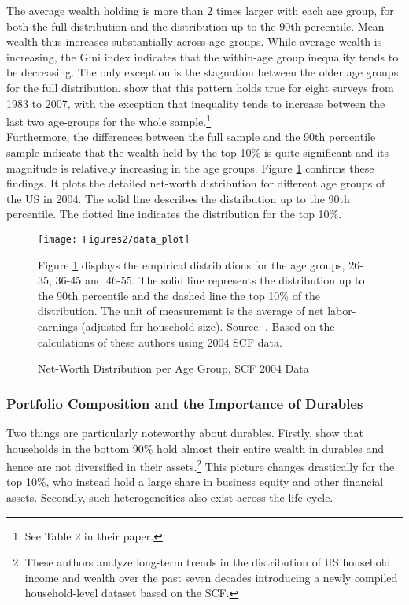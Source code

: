 \documentclass[a4paper,12pt,legno]{article}
\begin{document}
The average wealth holding is more than $2$ times larger with each age group, for both the full distribution and the distribution up to the 90th percentile. Mean wealth thus increases substantially across age groups. While average wealth is increasing, the Gini index indicates that the within-age group inequality tends to be decreasing. The only exception is the stagnation between the older age groups for the full distribution. \cite{hintermaier2011} show that this pattern holds true for eight surveys from 1983 to 2007, with the exception that inequality tends to  increase between the last two age-groups for the whole sample.\footnote{See Table 2 in their paper.} \\
Furthermore, the differences between the full sample and the 90th percentile sample indicate that the wealth held by the top 10\% is quite significant and its magnitude is relatively increasing in the age groups. Figure \ref{scf_data} confirms these findings. It plots the detailed net-worth distribution for different age groups of the US in 2004. The solid line describes the distribution up to the 90th percentile. The dotted line indicates the distribution for the top 10\%. 
\begin{figure}[!htbp]
\caption{Net-Worth Distribution per Age Group, SCF 2004 Data} 
\label{scf_data}	%
\centering
\texttt{[image: Figures2/data\_plot]}  %

\begin{minipage}{0.8\linewidth}
\footnotesize{Figure \ref{scf_data} displays the empirical distributions for the age groups, 26-35, 36-45 and 46-55. The solid line represents the distribution up to the 90th percentile and the dashed line the top 10\% of the distribution. The unit of measurement is the average of net labor-earnings (adjusted for household size). Source: \cite{hintermaier2011}. Based on the calculations of these authors using 2004 SCF data. }
\end{minipage}

\end{figure}

\subsubsection{Portfolio Composition and the Importance of Durables}
Two things are particularly noteworthy about durables. Firstly, \cite{kuhn2017income} show that households in the bottom 90\% hold almost their entire wealth in durables and hence are not diversified in their assets.\footnote{These authors analyze long-term trends in the distribution of US household income and wealth over the past seven decades introducing a newly compiled household-level dataset based on the SCF.} This picture changes drastically for the top 10\%, who instead hold a large share in business equity and other financial assets. Secondly, such heterogeneities also exist across the life-cycle. 
\end{document}
